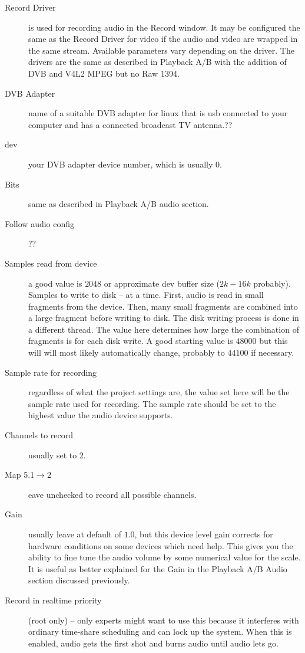 \begin{description}
    \item[Record Driver]  is used for recording audio in the Record window. It may be configured the same as the Record Driver for video if the audio and video are wrapped in the same stream. Available parameters vary depending on the driver.  The drivers are the same as described in Playback A/B with the addition of DVB and V4L2 MPEG but no Raw 1394.
    \item[DVB Adapter] name of a suitable DVB adapter for linux that is usb connected to your computer and has a connected broadcast TV antenna.??
    \item[dev] your DVB adapter device number, which is usually 0.
    \item[Bits] same as described in Playback A/B audio section.
    \item[Follow audio config] ??
    \item[Samples read from device]  a good value is $2048$ or approximate dev buffer size ($2k-16k$ probably).
    Samples to write to disk -- at a time. First, audio is read in small fragments from the device. Then, many small fragments are combined into a large fragment before writing to disk. The disk writing process is done in a different thread. The value here determines how large the combination of fragments is for each disk write.  A good starting value is $48000$ but this will will most likely automatically change, probably to $44100$ if necessary.
    \item[Sample rate for recording]  regardless of what the project settings are, the value set here will be the sample rate used for recording. The sample rate should be set to the highest value the audio device supports.
    \item[Channels to record] usually set to 2.
    \item[Map 5.1$\rightarrow$2]  eave unchecked to record all possible channels.
    \item[Gain]  usually leave at default of $1.0$, but this device level gain corrects for hardware conditions on some devices which need  help.  This gives you the ability to fine tune the audio volume by some numerical value for the scale.  It is useful as better explained for the Gain in the Playback A/B Audio section discussed previously.
    \item[Record in realtime priority] (root only) -- only experts might want to use this because it interferes with ordinary time-share scheduling and can lock up the system.  When this is enabled, audio gets the first shot and burns audio until audio lets go.
\end{description}

